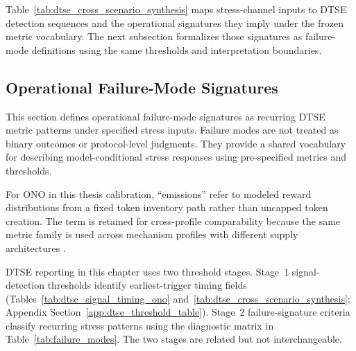 Table~\ref{tab:dtse_cross_scenario_synthesis} maps stress-channel inputs to DTSE detection sequences and the operational signatures they imply under the frozen metric vocabulary. The next subsection formalizes those signatures as failure-mode definitions using the same thresholds and interpretation boundaries.

\subsection{Operational Failure-Mode Signatures}
\label{failure-modes-observed-operational-definitions}
This section defines operational failure-mode signatures as recurring DTSE metric patterns under specified stress inputs. Failure modes are not treated as binary outcomes or protocol-level judgments. They provide a shared vocabulary for describing model-conditional stress responses using pre-specified metrics and thresholds.

For ONO in this thesis calibration, ``emissions'' refer to modeled reward distributions from a fixed token inventory path rather than uncapped token creation. The term is retained for cross-profile comparability because the same metric family is used across mechanism profiles with different supply architectures \cite{OnocoyToken, OnocoyRewards}.

DTSE reporting in this chapter uses two threshold stages. Stage~1 signal-detection thresholds identify earliest-trigger timing fields (Tables~\ref{tab:dtse_signal_timing_ono} and~\ref{tab:dtse_cross_scenario_synthesis}; Appendix Section~\ref{app:dtse_threshold_table}). Stage~2 failure-signature criteria classify recurring stress patterns using the diagnostic matrix in Table~\ref{tab:failure_modes}. The two stages are related but not interchangeable.

